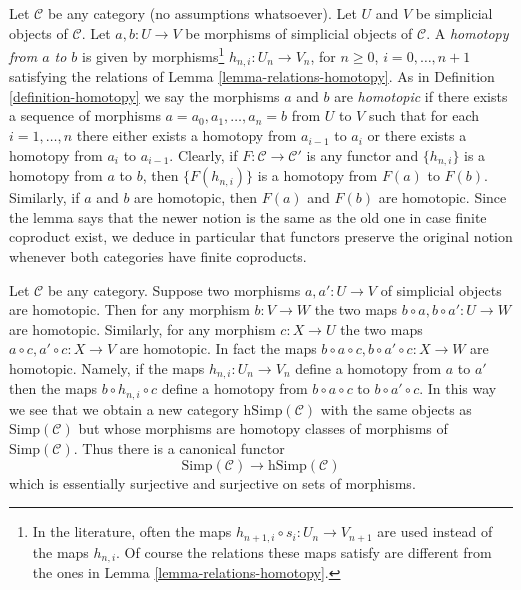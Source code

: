 \begin{remark}
\label{remark-homotopy-better}
Let $\mathcal{C}$ be any category (no assumptions whatsoever). Let
$U$ and $V$ be simplicial objects of $\mathcal{C}$. Let $a, b : U \to V$
be morphisms of simplicial objects of $\mathcal{C}$. A
{\it homotopy from $a$ to $b$} is given by
morphisms\footnote{In the literature, often the maps
$h_{n + 1, i} \circ s_i : U_n \to V_{n + 1}$ are used instead
of the maps $h_{n, i}$. Of course the relations these maps satisfy
are different from the ones in Lemma \ref{lemma-relations-homotopy}.}
$h_{n, i} : U_n \to V_n$, for $n \geq 0$, $i = 0, \ldots, n + 1$
satisfying the relations of Lemma \ref{lemma-relations-homotopy}.
As in Definition \ref{definition-homotopy} we say the morphisms $a$ and $b$
are {\it homotopic} if there exists a sequence of morphisms
$a = a_0, a_1, \ldots, a_n = b$ from $U$ to $V$ such that for each
$i = 1, \ldots, n$ there either exists a homotopy from $a_{i - 1}$ to $a_i$
or there exists a homotopy from $a_i$ to $a_{i - 1}$.
Clearly, if $F : \mathcal{C} \to \mathcal{C}'$ is any functor
and $\{h_{n, i}\}$ is a homotopy from $a$ to $b$, then
$\{F(h_{n, i})\}$ is a homotopy from $F(a)$ to $F(b)$.
Similarly, if $a$ and $b$ are homotopic, then $F(a)$ and $F(b)$
are homotopic.
Since the lemma says that the newer notion is the same
as the old one in case finite coproduct exist, we deduce
in particular that functors preserve the original notion
whenever both categories have finite coproducts.
\end{remark}

\begin{remark}
\label{remark-homotopy-pre-post-compose}
Let $\mathcal{C}$ be any category. Suppose two morphisms $a, a' : U \to V$
of simplicial objects are homotopic. Then for any morphism $b : V \to W$
the two maps $b \circ a, b \circ a' : U \to W$ are homotopic.
Similarly, for any morphism $c : X \to U$ the two maps
$a \circ c, a' \circ c : X \to V$ are homotopic. In fact the maps
$b \circ a \circ c, b \circ a' \circ c : X \to W$ are homotopic.
Namely, if the maps $h_{n, i} : U_n \to V_n$ define a homotopy from
$a$ to $a'$ then the maps $b \circ h_{n, i} \circ c$ define a homotopy
from $b \circ a \circ c$ to $b \circ a' \circ c$. In this way we see that
we obtain a new category $\text{hSimp}(\mathcal{C})$ with the same
objects as $\text{Simp}(\mathcal{C})$ but whose morphisms are
homotopy classes of morphisms of $\text{Simp}(\mathcal{C})$.
Thus there is a canonical functor
$$
\text{Simp}(\mathcal{C})
\longrightarrow
\text{hSimp}(\mathcal{C})
$$
which is essentially surjective and surjective on sets of morphisms.
\end{remark}


